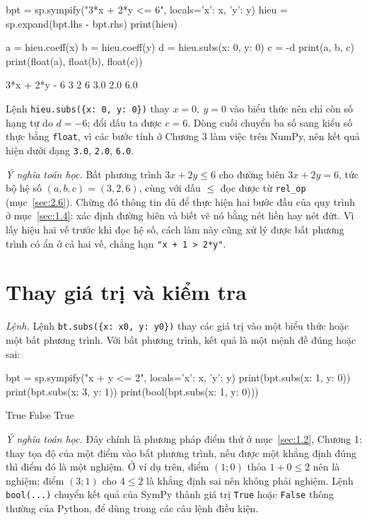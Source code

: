 \documentclass[12pt,a4paper]{report}
\begin{document}
\begin{madoanbox}
bpt = sp.sympify("3*x + 2*y <= 6", locals={'x': x, 'y': y})
hieu = sp.expand(bpt.lhs - bpt.rhs)
print(hieu)

a = hieu.coeff(x)
b = hieu.coeff(y)
d = hieu.subs({x: 0, y: 0})
c = -d
print(a, b, c)
print(float(a), float(b), float(c))
\end{madoanbox}

\begin{ketquabox}
3*x + 2*y - 6
3 2 6
3.0 2.0 6.0
\end{ketquabox}

Lệnh \texttt{hieu.subs(\{x: 0, y: 0\})} thay $x=0,\ y=0$ vào biểu thức nên chỉ còn số hạng tự do $d=-6$; đổi dấu ta được $c=6$. Dòng cuối chuyển ba số sang kiểu số thực bằng \texttt{float}, vì các bước tính ở Chương 3 làm việc trên NumPy, nên kết quả hiện dưới dạng \texttt{3.0}, \texttt{2.0}, \texttt{6.0}.

\textit{Ý nghĩa toán học.} Bất phương trình $3x+2y\le 6$ cho đường biên $3x+2y=6$, tức bộ hệ số $(a,b,c)=(3,2,6)$, cùng với dấu $\le$ đọc được từ \texttt{rel\_op} (mục~\ref{sec:2.6}). Chừng đó thông tin đủ để thực hiện hai bước đầu của quy trình ở mục~\ref{sec:1.4}: xác định đường biên và biết vẽ nó bằng nét liền hay nét đứt. Vì lấy hiệu hai vế trước khi đọc hệ số, cách làm này cũng xử lý được bất phương trình có ẩn ở cả hai vế, chẳng hạn \texttt{"x + 1 > 2*y"}.

\section{Thay giá trị và kiểm tra}
\label{sec:2.8}

\textit{Lệnh.} Lệnh \texttt{bt.subs(\{x: x0, y: y0\})} thay các giá trị vào một biểu thức hoặc một bất phương trình. Với bất phương trình, kết quả là một mệnh đề đúng hoặc sai:

\begin{madoanbox}
bpt = sp.sympify("x + y <= 2", locals={'x': x, 'y': y})
print(bpt.subs({x: 1, y: 0}))
print(bpt.subs({x: 3, y: 1}))
print(bool(bpt.subs({x: 1, y: 0})))
\end{madoanbox}

\begin{ketquabox}
True
False
True
\end{ketquabox}

\textit{Ý nghĩa toán học.} Đây chính là phương pháp điểm thử ở mục~\ref*{sec:1.2}, Chương 1: thay tọa độ của một điểm vào bất phương trình, nếu được một khẳng định đúng thì điểm đó là một nghiệm. Ở ví dụ trên, điểm $(1;0)$ thỏa $1+0\le 2$ nên là nghiệm; điểm $(3;1)$ cho $4\le 2$ là khẳng định sai nên không phải nghiệm. Lệnh \texttt{bool(...)} chuyển kết quả của SymPy thành giá trị \texttt{True} hoặc \texttt{False} thông thường của Python, để dùng trong các câu lệnh điều kiện.
\end{document}
